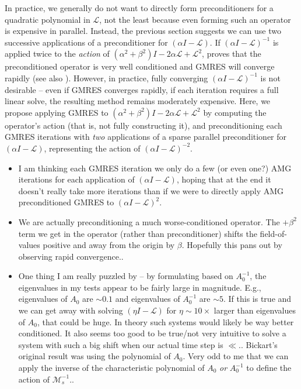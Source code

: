 \documentclass[a4paper,10pt]{article}
\begin{document}
In practice, we generally do not want to directly form preconditioners for a quadratic
polynomial in $\mathcal{L}$, not the least because even forming such an operator is 
expensive in parallel. Instead, the previous section suggests we can use two successive 
applications of a preconditioner for $(\alpha I - \mathcal{L})$. If $(\alpha I - \mathcal{L})^{-1}$
is applied twice to the \textit{action} of $(\alpha^2+\beta^2)I - 2\alpha\mathcal{L} + \mathcal{L}^2$,
 proves that the preconditioned operator is very well conditioned and GMRES
will converge rapidly (see also ). However, in practice, fully converging
$(\alpha I - \mathcal{L})^{-1}$ is not desirable --  even if GMRES converges rapidly,
if each iteration requires a full linear solve, the resulting method remains moderately
expensive. 
Here, we propose applying GMRES to $(\alpha^2+\beta^2)I - 2\alpha\mathcal{L} + \mathcal{L}^2$
by computing the operator's action (that is, not fully constructing it), and preconditioning
each GMRES iterations with \textit{two} applications of a sparse parallel preconditioner for
$(\alpha I - \mathcal{L})$, representing the action of $(\alpha I - \mathcal{L})^{-2}$. 



{\color{blue}
\begin{itemize}
	\item I am thinking each GMRES iteration we only do a few (or even one?) AMG iterations
	for each application of $(\alpha I - \mathcal{L})$, hoping that at the end it doesn't
	really take more iterations than if we were to directly apply AMG preconditioned GMRES
	to $(\alpha I - \mathcal{L})^2$.

	\item We are actually preconditioning a much worse-conditioned operator. The $+\beta^2$
	term we get in the operator (rather than preconditioner) shifts the field-of-values 
	positive and away from the origin by $\beta$. Hopefully this pans out by observing
	rapid convergence..

	\item One thing I am really puzzled by -- by formulating based on $A_0^{-1}$, the
	eigenvalues in my tests appear to be fairly large in magnitude. E.g., eigenvalues of
	$A_0$ are $\sim 0.1$ and eigenvalues of $A_0^{-1}$ are $\sim 5$. If this is true and we
	can get away with solving $(\eta I -\mathcal{L})$ for $\eta \sim 10\times$ larger than
	eigenvalues of $A_0$, that could be huge. In theory such systems would likely be way
	better conditioned. It also seems too good to be true/not very intuitive to solve a
	system with such a big shift when our actual time step is $\ll$.. Bickart's original
	result was using the polynomial of $A_0$. Very odd to me that we can apply the inverse of
	the characteristic polynomial of $A_0$ \textit{or} $A_0^{-1}$ to define the action of
	$\mathcal{M}_s^{-1}$..

\end{itemize}
}
\end{document}
